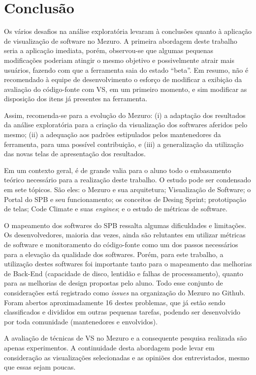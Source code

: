 \chapter[Conclusão]{Conclusão}\label{chap:conclusao}

Os vários desafios na análise exploratória levaram à conclusões quanto à
aplicação de visualização de software no Mezuro. A primeira abordagem deste
trabalho seria a aplicação imediata, porém, observou-se que algumas pequenas
modificações poderiam atingir o mesmo objetivo e possivelmente atrair mais
usuários, fazendo com que a ferramenta saia do estado ``beta''. Em resumo, não
é recomendado à equipe de desenvolvimento o esforço de modificar a exibição da
avaliação do código-fonte com VS, em um primeiro momento, e sim modificar as
disposição dos itens já presentes na ferramenta.

Assim, recomenda-se para a evolução do Mezuro: (i) a adaptação dos resultados da
análise exploratória para a criação da visualização dos softwares aferidos pelo
mesmo; (ii) a adequação aos padrões estipulados pelos mantenedores da
ferramenta, para uma possível contribuição, e (iii) a generalização da
utilização das novas telas de apresentação dos resultados.

Em um contexto geral, é de grande valia para o aluno todo o embasamento teórico
necessário para a realização deste trabalho. O estudo pode ser condensado em sete
tópicos. São eles: o Mezuro e sua arquitetura; Visualização de Software; o
Portal do SPB e seu funcionamento; os conceitos de Desing Sprint; prototipação
de telas; Code Climate e suas \textit{engines}; e o estudo de métricas de
software.

O mapeamento dos softwares do SPB ressalta algumas dificuldades e limitações.
Os desenvolvedores, maioria das vezes, ainda são relutantes em utilizar métricas
de software e monitoramento do código-fonte como um dos passos necessários para
a elevação da qualidade dos softwares. Porém, para este trabalho, a utilização
destes softwares foi importante tanto para o mapeamento das melhorias de
Back-End (capacidade de disco, lentidão e falhas de processamento), quanto para
as melhorias de design propostas pelo aluno. Todo esse conjunto de considerações
está registrado como \textit{issues} na organização do Mezuro no Github. Foram
abertos aproximadamente 16 destes problemas, que já estão sendo classificados
e divididos em outras pequenas tarefas, podendo ser desenvolvido por toda
comunidade (mantenedores e envolvidos).

A avaliação de técnicas de VS no Mezuro e a consequente pesquisa realizada são
apenas experimentos. A continuidade desta abordagem pode levar em consideração
as visualizações selecionadas e as opiniões dos entrevistados, mesmo que essas
sejam poucas.
